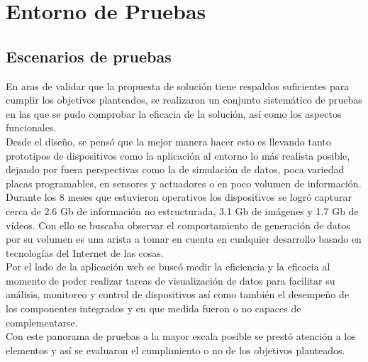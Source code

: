 

\chapter{ Entorno de Pruebas}
\section{Escenarios de pruebas}
En aras de validar que la propuesta de solución tiene respaldos suficientes para cumplir los objetivos planteados, se realizaron un conjunto sistemático de pruebas en las que se pudo comprobar la eficacia de la solución, así como los aspectos funcionales.\\

Desde el diseño, se pensó que la mejor manera hacer esto es llevando tanto prototipos de dispositivos como la aplicación al entorno lo más realista posible, dejando por fuera perspectivas como la de simulación de datos, poca variedad placas programables, en sensores y actuadores o en poco volumen de información.\\

Durante los 8 meses que estuvieron operativos los dispositivos se logró capturar cerca de 2.6 Gb de información no estructurada, 3.1 Gb de imágenes y 1.7 Gb de vídeos. Con ello se buscaba observar el comportamiento de generación de datos por su volumen es una arista a tomar en cuenta en cualquier desarrollo basado en tecnologías del Internet de las cosas.\\

Por el lado de la aplicación web se buscó medir la eficiencia y la eficacia al momento de poder realizar tareas de visualización de datos para facilitar su análisis, monitoreo y control de dispositivos así como también el desempeño de los componentes integrados y en que medida fueron o no capaces de complementarse.\\

Con este panorama de pruebas a la mayor escala posible se prestó atención a los elementos y así se evaluaron el cumplimiento o no de los objetivos planteados. 


